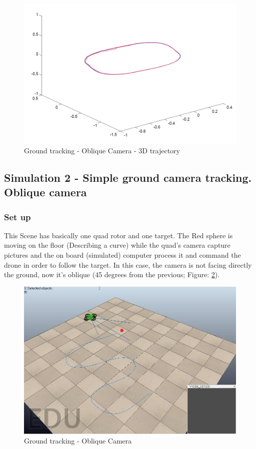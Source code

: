 \begin{figure}[h]
\centering
\includegraphics[width=0.7\linewidth]{../Images/c3/sim1_traj_both_3d}
\caption{Ground tracking - Oblique Camera - 3D trajectory}
\label{fig:sim1_traj_both_3d}
\end{figure}




\subsection{Simulation 2 - Simple ground camera tracking. Oblique camera}
\subsubsection{Set up}
This Scene has basically one quad rotor and one target. The Red sphere is moving on the floor (Describing a curve) while the quad's camera capture pictures and the on board (simulated) computer process it and command the drone in order to follow the target. In this case, the camera is not facing directly the ground, now it's oblique (45 degrees from the previous; Figure: \ref{fig:ground_tracking_scene_oblique}).

\begin{figure}[h]
	\centering
	\includegraphics[width=0.7\linewidth]{../Images/c3/ground_tracking_scene_oblique}
	\caption{Ground tracking - Oblique Camera}
	\label{fig:ground_tracking_scene_oblique}
\end{figure}

